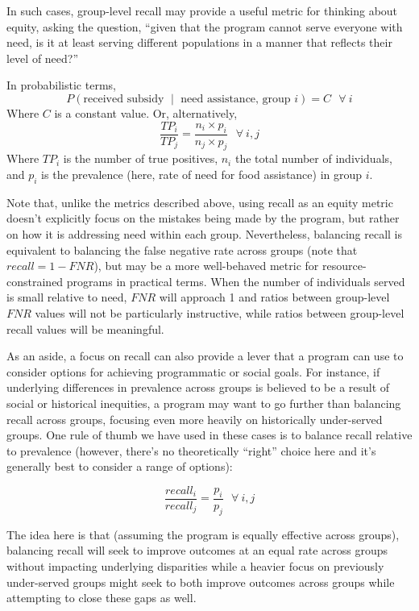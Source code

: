 \documentclass[]{krantz}
\begin{document}
In such cases, group-level recall may provide a useful metric for
thinking about equity, asking the question, ``given that the program
cannot serve everyone with need, is it at least serving different
populations in a manner that reflects their level of need?''

In probabilistic terms,
\[P(\textrm{received subsidy $\mid$ need assistance, group $i$}) = C~~~\forall~i\]
Where \(C\) is a constant value. Or, alternatively,
\[\frac{TP_i}{TP_j} = \frac{n_i \times p_i}{n_j \times p_j}~~~\forall~i,j\]
Where \(TP_i\) is the number of true positives, \(n_i\) the total number
of individuals, and \(p_i\) is the prevalence (here, rate of need for
food assistance) in group \(i\).

Note that, unlike the metrics described above, using recall as an equity
metric doesn't explicitly focus on the mistakes being made by the
program, but rather on how it is addressing need within each group.
Nevertheless, balancing recall is equivalent to balancing the false
negative rate across groups (note that \(recall = 1-FNR\)), but may be a
more well-behaved metric for resource-constrained programs in practical
terms. When the number of individuals served is small relative to need,
\(FNR\) will approach 1 and ratios between group-level \(FNR\) values
will not be particularly instructive, while ratios between group-level
recall values will be meaningful.

As an aside, a focus on recall can also provide a lever that a program
can use to consider options for achieving programmatic or social goals.
For instance, if underlying differences in prevalence across groups is
believed to be a result of social or historical inequities, a program
may want to go further than balancing recall across groups, focusing
even more heavily on historically under-served groups. One rule of thumb
we have used in these cases is to balance recall relative to prevalence
(however, there's no theoretically ``right'' choice here and it's
generally best to consider a range of options):

\[\frac{recall_i}{recall_j} = \frac{p_i}{p_j}~~~\forall~i,j\]

The idea here is that (assuming the program is equally effective across
groups), balancing recall will seek to improve outcomes at an equal rate
across groups without impacting underlying disparities while a heavier
focus on previously under-served groups might seek to both improve
outcomes across groups while attempting to close these gaps as well.
\end{document}
